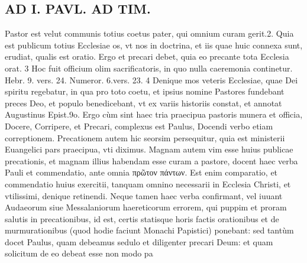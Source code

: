 \documentclass{article}
\begin{document}
\begin{pages}
\section*{AD I. PAVL. AD TIM. }
\marginpar{[ p.40 ]}\pstart Pastor est velut communis totius coetus pater, qui omnium curam gerit.2. Quia est publicum totius Ecclesiae os, vt nos in doctrina, et iis quae huic connexa sunt, erudiat, qualis est oratio. Ergo et precari debet, quia eo precante tota Ecclesia orat. 3 Hoc fuit officium olim sacrificatoris, in quo nulla caeremonia continetur. Hebr. 9. vers. 24. Numeror. 6.vers. 23. 4 Denique mos veteris Ecclesiae, quae Dei spiritu regebatur, in qua pro toto coetu, et ipsius nomine Pastores fundebant preces Deo, et populo benedicebant, vt ex variis historiis constat, et annotat Augustinus Epist.9o.  \pend\pstart Ergo cùm sint haec tria praecipua pastoris munera et officia, Docere, Corripere, et Precari, complexus est Paulus, Docendi verbo etiam correptionem. Precationem autem hic seorsim persequitur, quia est ministerii Euangelici pars praecipua, vti diximus.  \pend\pstart Magnam autem vim esse huius publicae precationis, et magnam illius habendam esse curam a pastore, docent haec verba Pauli et commendatio, ante omnia πρῶτον πάντων. Est enim comparatio, et commendatio huius exercitii, tanquam omnino necessarii in Ecclesia Christi, et vtilissimi, denique retinendi. Neque tamen haec verba confirmant, vel iuuant Audaeorum siue Messalaniorum haereticorum errorem, qui puppim et proram salutis in precationibus, id est, certis statisque horis factis orationibus et de murmurationibus (quod hodie faciunt Monachi Papistici) ponebant: sed tantùm docet Paulus, quam debeamus sedulo et diligenter precari Deum: et quam solicitum de eo debeat esse non modo pa\pend

\end{pages}
\end{document}
